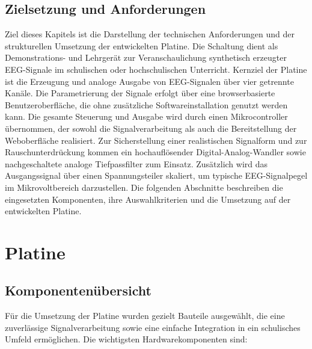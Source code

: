 \section{Zielsetzung und Anforderungen}

Ziel dieses Kapitels ist die Darstellung der technischen Anforderungen und der strukturellen Umsetzung der entwickelten Platine. Die Schaltung dient als Demonstrations- und Lehrgerät zur Veranschaulichung synthetisch erzeugter EEG-Signale im schulischen oder hochschulischen Unterricht.
Kernziel der Platine ist die Erzeugung und analoge Ausgabe von EEG-Signalen über vier getrennte Kanäle. Die Parametrierung der Signale erfolgt über eine browserbasierte Benutzeroberfläche, die ohne zusätzliche Softwareinstallation genutzt werden kann. Die gesamte Steuerung und Ausgabe wird durch einen Mikrocontroller übernommen, der sowohl die Signalverarbeitung als auch die Bereitstellung der Weboberfläche realisiert.
Zur Sicherstellung einer realistischen Signalform und zur Rauschunterdrückung kommen ein hochauflösender Digital-Analog-Wandler sowie nachgeschaltete analoge Tiefpassfilter zum Einsatz. Zusätzlich wird das Ausgangssignal über einen Spannungsteiler skaliert, um typische EEG-Signalpegel im Mikrovoltbereich darzustellen.
Die folgenden Abschnitte beschreiben die eingesetzten Komponenten, ihre Auswahlkriterien und die Umsetzung auf der entwickelten Platine.


\chapter{Platine}

\section{Komponentenübersicht}

Für die Umsetzung der Platine wurden gezielt Bauteile ausgewählt, die eine zuverlässige Signalverarbeitung sowie eine einfache Integration in ein schulisches Umfeld ermöglichen. Die wichtigsten Hardwarekomponenten sind:

